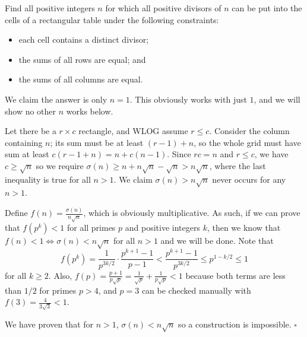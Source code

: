 
\begin{problem}[ISL 2016 C2]
    Find all positive integers $n$ for which all positive divisors of $n$ can
    be put into the cells of a rectangular table under the following constraints: \begin{itemize}
        \item each cell contains a distinct divisor;
        \item the sums of all rows are equal; and
        \item the sums of all columns are equal.
    \end{itemize}
\end{problem}

\begin{solution}[Ritwin]
    We claim the answer is only $n = 1$. This obviously works with just $\boxed{1}$,
    and we will show no other $n$ works below.
    
    Let there be a $r \times c$ rectangle, and WLOG assume $r \leq c$. Consider
    the column containing $n$; its sum must be at least $(r-1) + n$, so the whole
    grid must have sum at least $c(r-1+n) = n + c(n-1)$. Since $rc = n$ and
    $r \leq c$, we have $c \geq \sqrt n$ so we require
    $\sigma(n) \geq n + n \sqrt n - \sqrt n > n \sqrt n$, where the last
    inequality is true for all $n > 1$. We claim $\sigma(n) > n \sqrt n$ never
    occurs for any $n > 1$.
    
    Define $f(n) = \tfrac{\sigma(n)}{n\sqrt n}$, which is obviously multiplicative.
    As such, if we can prove that $f(p^k) < 1$ for all primes $p$ and positive
    integers $k$, then we know that $f(n) < 1 \Longleftrightarrow \sigma(n) < n \sqrt n$
    for all $n > 1$ and we will be done. Note that
    \[f(p^k) = \frac{1}{p^{3k/2}} \cdot \frac{p^{k+1}-1}{p-1} < \frac{p^{k+1}-1}{p^{3k/2}} \leq p^{1-k/2} \leq 1\]
    for all $k \geq 2$. Also, $f(p) = \tfrac{p+1}{p \sqrt p} = \frac{1}{\sqrt p} + \frac{1}{p \sqrt p} < 1$
    because both terms are less than $1/2$ for primes $p > 4$, and $p=3$ can be
    checked manually with $f(3) = \tfrac{4}{3\sqrt3} < 1$.
    
    We have proven that for $n > 1$, $\sigma(n) < n \sqrt n$ so a construction
    is impossible. $\square$
\end{solution}
